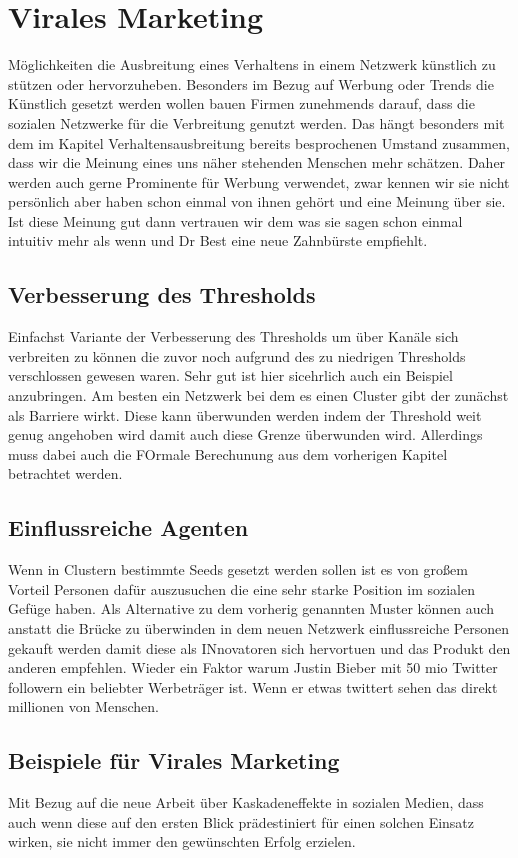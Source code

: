 \documentclass[12pt]{article}
\begin{document}
{\section{Virales Marketing}
Möglichkeiten die Ausbreitung eines Verhaltens in einem Netzwerk künstlich zu stützen oder hervorzuheben. Besonders im Bezug auf Werbung oder Trends die Künstlich gesetzt werden wollen bauen Firmen zunehmends darauf, dass die sozialen Netzwerke für die Verbreitung genutzt werden. Das hängt besonders mit dem im Kapitel Verhaltensausbreitung bereits besprochenen Umstand zusammen, dass wir die Meinung eines uns näher stehenden Menschen mehr schätzen. Daher werden auch gerne Prominente für Werbung verwendet, zwar kennen wir sie nicht persönlich aber haben schon einmal von ihnen gehört und eine Meinung über sie. Ist diese Meinung gut dann vertrauen wir dem was sie sagen schon einmal intuitiv mehr als wenn und Dr Best eine neue Zahnbürste empfiehlt.
\subsection{Verbesserung des Thresholds}
Einfachst Variante der Verbesserung des Thresholds um über Kanäle sich verbreiten zu können die zuvor noch aufgrund des zu niedrigen Thresholds verschlossen gewesen waren. Sehr gut ist hier sicehrlich auch ein Beispiel anzubringen. Am besten ein Netzwerk bei dem es einen Cluster gibt der zunächst als Barriere wirkt. Diese kann überwunden werden indem der Threshold weit genug angehoben wird damit auch diese Grenze überwunden wird. Allerdings muss dabei auch die FOrmale Berechunung aus dem vorherigen Kapitel betrachtet werden.
\subsection{Einflussreiche Agenten}
Wenn in Clustern bestimmte Seeds gesetzt werden sollen ist es von großem Vorteil Personen dafür auszusuchen die eine sehr starke Position im sozialen Gefüge haben. Als Alternative zu dem vorherig genannten Muster können auch anstatt die Brücke zu überwinden in dem neuen Netzwerk einflussreiche Personen gekauft werden damit diese als INnovatoren sich hervortuen und das Produkt den anderen empfehlen. Wieder ein Faktor warum Justin Bieber mit 50 mio Twitter followern ein beliebter Werbeträger ist. Wenn er etwas twittert sehen das direkt millionen von Menschen. 
\subsection{Beispiele für Virales Marketing}
Mit Bezug auf die neue Arbeit über Kaskadeneffekte in sozialen Medien, dass auch wenn diese auf den ersten Blick prädestiniert für einen solchen Einsatz wirken, sie nicht immer den gewünschten Erfolg erzielen. 

}
\end{document}
